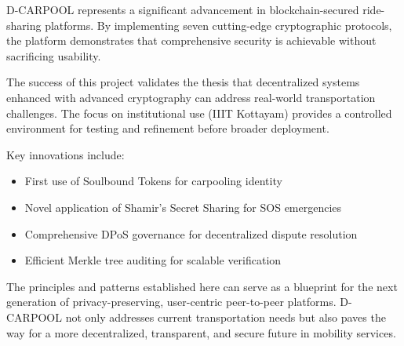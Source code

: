 \documentclass[12pt]{report}
\theoremstyle{plain}
\theoremstyle{definition}
\theoremstyle{remark}
\begin{document}
D-CARPOOL represents a significant advancement in blockchain-secured ride-sharing platforms. By implementing seven cutting-edge cryptographic protocols, the platform demonstrates that comprehensive security is achievable without sacrificing usability.

The success of this project validates the thesis that decentralized systems enhanced with advanced cryptography can address real-world transportation challenges. The focus on institutional use (IIIT Kottayam) provides a controlled environment for testing and refinement before broader deployment.

Key innovations include:

\begin{itemize}
    \item First use of Soulbound Tokens for carpooling identity
    \item Novel application of Shamir's Secret Sharing for SOS emergencies
    \item Comprehensive DPoS governance for decentralized dispute resolution
    \item Efficient Merkle tree auditing for scalable verification
\end{itemize}

The principles and patterns established here can serve as a blueprint for the next generation of privacy-preserving, user-centric peer-to-peer platforms. D-CARPOOL not only addresses current transportation needs but also paves the way for a more decentralized, transparent, and secure future in mobility services.

\end{document}
